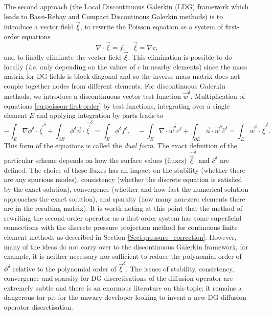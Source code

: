 The second approach (the Local Discontinuous Galerkin (LDG) framework
\citep{cockburn1998,sherwin2006} which leads to Bassi-Rebay and
Compact Discontinous Galerkin methods) is to introduce a vector field
$\vec{\xi}$, to rewrite the Poisson equation as a system of
first-order equations 
\begin{equation}
\label{eq:poisson-first-order}
\nabla\cdot\vec{\xi} = f, \quad \vec{\xi}=\nabla c,
\end{equation}
and to finally eliminate the vector field $\vec{\xi}$. This
elimination is possible to do locally (\emph{i.e.} only depending on
the values of $c$ in nearby elements) since the mass matrix for DG
fields is block diagonal and so the inverse mass matrix does not
couple together nodes from different elements. For discontinuous
Galerkin methods, we introduce a discontinuous vector test function
$\vec{w}^{\delta}$. Multiplication of equations
\eqref{eq:poisson-first-order} by test functions, integrating over a
single element $E$ and applying integration by parts leads to
\begin{equation}
\label{eq:ldg}
-\int_E\nabla\phi^{\delta}\cdot\vec{\xi}^\delta + \int_{\partial E}
\phi^\delta\vec{n}\cdot\hat{\vec{\xi}}^{\delta} =
\int_E\phi^\delta f^\delta,
\quad
-\int_E\nabla\cdot\vec{w}^\delta c^\delta + \int_{\partial E}
\vec{n}\cdot\vec{w}^\delta \hat{c}^\delta = \int_E\vec{w}^\delta\cdot\vec{\xi}^\delta.
\end{equation}
This form of the equations is called the \emph{dual form}.  The exact
definition of the particular scheme depends on how the surface values
(fluxes) $\hat{\vec{\xi}}^\delta$ and $\hat{c}^\delta$ are
defined. The choice of these fluxes has an impact on the stability
(whether there are any spurious modes), consistency (whether the
discrete equation is satisfied by the exact solution), convergence
(whether and how fast the numerical solution approaches the exact
solution), and sparsity (how many non-zero elements there are in the
resulting matrix). It is worth noting at this point that the method of
rewriting the second-order operator as a first-order system has some
superficial connections with the discrete pressure projection method
for continuous finite element methods as described in Section
\ref{Sect:pressure_correction}. However, many of the ideas do not
carry over to the discontinuous Galerkin framework, for example, it is
neither necessary nor sufficient to reduce the polynomial order of
$\phi^\delta$ relative to the polynomial order of
$\vec{\xi}^\delta$. The issues of stability, consistency, convergence
and sparsity for DG discretisations of the diffusion operator are
extremely subtle and there is an enormous literature on this topic; it
remains a dangerous tar pit for the unwary developer looking to invent
a new DG diffusion operator discretisation.

